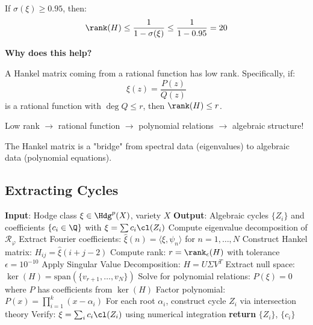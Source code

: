 \begin{theorem}\label{thm:low-rank}
If $\sigma(\xi) \geq 0.95$, then:
\begin{equation}
\rank(H) \leq \frac{1}{1-\sigma(\xi)} \leq \frac{1}{1-0.95} = 20
\end{equation}
\end{theorem}

\begin{intuitive}
\textbf{Why does this help?}

A Hankel matrix coming from a rational function has low rank. Specifically, if:
\begin{equation}
\xi(z) = \frac{P(z)}{Q(z)}
\end{equation}
is a rational function with $\deg Q \leq r$, then $\rank(H) \leq r$.

Low rank $\to$ rational function $\to$ polynomial relations $\to$ algebraic structure!

The Hankel matrix is a "bridge" from spectral data (eigenvalues) to algebraic data (polynomial equations).
\end{intuitive}

\subsection{Extracting Cycles}

\begin{algorithm}
\caption{Extract Algebraic Cycles from Hodge Class}
\label{alg:cycle-extraction}
\begin{algorithmic}[1]
\STATE \textbf{Input}: Hodge class $\xi \in \Hdg^p(X)$, variety $X$
\STATE \textbf{Output}: Algebraic cycles $\{Z_i\}$ and coefficients $\{c_i \in \Q\}$ with $\xi = \sum c_i \cl(Z_i)$
\STATE
\STATE Compute eigenvalue decomposition of $\mathcal{R}_\varphi$
\STATE Extract Fourier coefficients: $\hat{\xi}(n) = \langle \xi, \psi_n \rangle$ for $n = 1, \ldots, N$
\STATE Construct Hankel matrix: $H_{ij} = \hat{\xi}(i+j-2)$
\STATE Compute rank: $r = \rank_{\epsilon}(H)$ with tolerance $\epsilon = 10^{-10}$
\STATE Apply Singular Value Decomposition: $H = U \Sigma V^T$
\STATE Extract null space: $\ker(H) = \text{span}(\{v_{r+1}, \ldots, v_N\})$
\STATE Solve for polynomial relations: $P(\xi) = 0$ where $P$ has coefficients from $\ker(H)$
\STATE Factor polynomial: $P(x) = \prod_{i=1}^{k} (x - \alpha_i)$
\STATE For each root $\alpha_i$, construct cycle $Z_i$ via intersection theory
\STATE Verify: $\xi = \sum_{i} c_i \cl(Z_i)$ using numerical integration
\STATE \textbf{return} $\{Z_i\}$, $\{c_i\}$
\end{algorithmic}
\end{algorithm}

